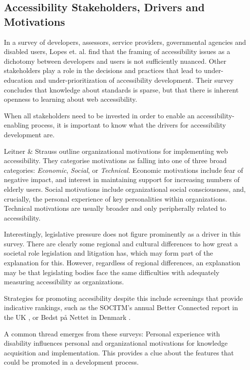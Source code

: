 

\subsection{Accessibility Stakeholders, Drivers and Motivations} %
\label{sub:stakeholders}

In a survey of developers, assessors, service providers, governmental agencies and disabled users, Lopes et. al. \cite{Lopes:2010} find that the framing of accessibility issues as a dichotomy between developers and users is not sufficiently nuanced. Other stakeholders play a role in the decisions and practices that lead to under-education and under-prioritization of accessibility development. Their survey concludes that knowledge about standards is sparse, but that there is inherent openness to learning about web accessibility.

When all stakeholders need to be invested in order to enable an accessibility-enabling process, it is important to know what the drivers for accessibility development are.

Leitner \& Strauss \cite{Leitner:2010} outline organizational motivations for implementing web accessibility. They categorise motivations as falling into one of three broad categories: \emph{Economic}, \emph{Social}, or \emph{Technical}. Economic motivations include fear of negative impact, and interest in maintaining support for increasing numbers of elderly users. Social motivations include organizational social consciousness, and, crucially, the personal experience of key personalities within organizations. Technical motivations are usually broader and only peripherally related to accessibility.

Interestingly, legislative pressure does not figure prominently as a driver in this survey. There are clearly some regional and cultural differences to how great a societal role legislation and litigation has, which may form part of the explanation for this. However, regardless of regional differences, an explanation may be that legislating bodies face the same difficulties with adequately measuring accessibility as organizations. 

Strategies for promoting accesibility despite this include screenings that provide indicative rankings, such as the \ac{SOCITM}'s annual Better Connected report in the UK \cite{betterconnected:2013}, or Bedst p\aa{} Nettet in Denmark \cite{bedstpaanettet:2013}.

A common thread emerges from these surveys: Personal experience with disability influences personal and organizational motivations for knowledge acquisition and implementation.
This provides a clue about the features that could be promoted in a development process.


